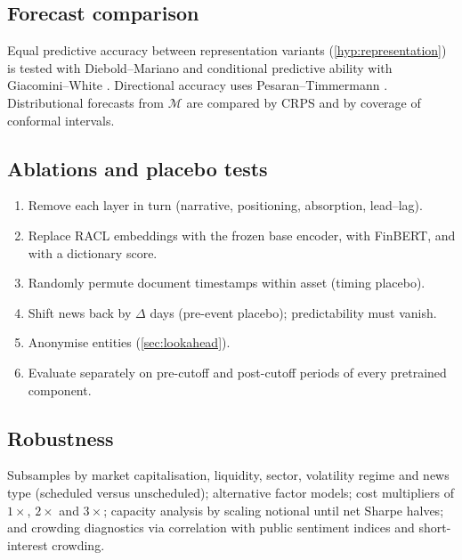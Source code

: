 \documentclass[11pt,a4paper]{article}
\theoremstyle{plain}
\theoremstyle{definition}
\theoremstyle{remark}
\begin{document}
\subsection{Forecast comparison}
Equal predictive accuracy between representation variants (\cref{hyp:representation}) is tested with Diebold--Mariano \citep{diebold1995} and conditional predictive ability with Giacomini--White \citep{giacomini2006}. Directional accuracy uses Pesaran--Timmermann \citep{pesaran1992}. Distributional forecasts from $\mathcal{M}$ are compared by CRPS and by coverage of conformal intervals.

\subsection{Ablations and placebo tests}
\begin{enumerate}[label=(\alph*)]
  \item Remove each layer in turn (narrative, positioning, absorption, lead--lag).
  \item Replace RACL embeddings with the frozen base encoder, with FinBERT, and with a dictionary score.
  \item Randomly permute document timestamps within asset (timing placebo).
  \item Shift news back by $\Delta$ days (pre-event placebo); predictability must vanish.
  \item Anonymise entities (\cref{sec:lookahead}).
  \item Evaluate separately on pre-cutoff and post-cutoff periods of every pretrained component.
\end{enumerate}

\subsection{Robustness}
Subsamples by market capitalisation, liquidity, sector, volatility regime and news type (scheduled versus unscheduled); alternative factor models; cost multipliers of $1\times$, $2\times$ and $3\times$; capacity analysis by scaling notional until net Sharpe halves; and crowding diagnostics via correlation with public sentiment indices and short-interest crowding.
\end{document}
